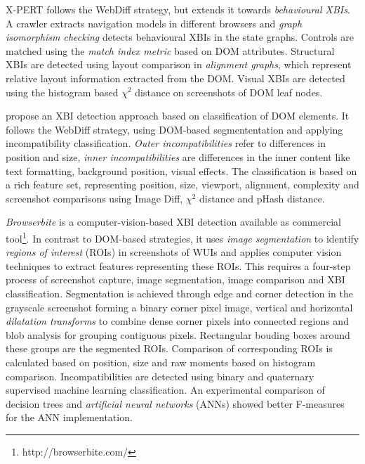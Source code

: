 X-PERT \autocite{RoyChoudhary2014XPERT,Choudhary2013XPERT} follows the WebDiff strategy, but extends it towards \emph{behavioural XBIs}.
A crawler extracts navigation models in different browsers and \emph{graph isomorphism checking} detects behavioural XBIs in the state graphs.
Controls are matched using the \emph{match index metric} based on DOM attributes.
Structural XBIs are detected using layout comparison in \emph{alignment graphs}, which represent relative layout information extracted from the DOM.
Visual XBIs are detected using the histogram based \(\chi^2\) distance on screenshots of DOM leaf nodes.

\autocite{Watanabe2018} propose an XBI detection approach based on classification of DOM elements.
It follows the WebDiff strategy, using DOM-based segmententation and applying incompatibility classification.
\emph{Outer incompatibilities} refer to differences in position and size, \emph{inner incompatibilities} are differences in the inner content like text formatting, background position, visual effects.
The classification is based on a rich feature set, representing position, size, viewport, alignment, complexity and screenshot comparisons using Image Diff, \(\chi^2\) distance and pHash distance.

\emph{Browserbite} \autocite{Saar2016Browserbite,Semenenko2013Browserbite} is a computer-vision-based XBI detection available as commercial tool\footnote{http://browserbite.com/}.
In contrast to DOM-based strategies, it uses \emph{image segmentation} to identify \emph{regions of interest} (ROIs) in screenshots of WUIs and applies computer vision techniques to extract features representing these ROIs.
This requires a four-step process of screenshot capture, image segmentation, image comparison and XBI classification.
Segmentation is achieved through edge and corner detection in the grayscale screenshot forming a binary corner pixel image, vertical and horizontal \emph{dilatation transforms} to combine dense corner pixels into connected regions and blob analysis for grouping contiguous pixels.
Rectangular bouding boxes around these groups are the segmented ROIs.
Comparison of corresponding ROIs is calculated based on position, size and raw moments based on histogram comparison.
Incompatibilities are detected using binary and quaternary supervised machine learning classification.
An experimental comparison of decision trees and \emph{artificial neural networks} (ANNs) showed better F-measures for the ANN implementation.

